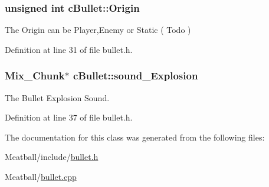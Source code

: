 \hypertarget{classc_bullet_a66bf644008f15b642e59514778d0dd42}{
\subsubsection[{Origin}]{\setlength{\rightskip}{0pt plus 5cm}unsigned int c\-Bullet\-::\-Origin}}\label{classc_bullet_a66bf644008f15b642e59514778d0dd42}


The Origin can be Player,Enemy or Static ( Todo ) 



Definition at line 31 of file bullet.\-h.

\hypertarget{classc_bullet_a05793bd5f273e252f3f491c532d45be1}{
\subsubsection[{sound\-\_\-\-Explosion}]{\setlength{\rightskip}{0pt plus 5cm}Mix\-\_\-\-Chunk$\ast$ c\-Bullet\-::sound\-\_\-\-Explosion}}\label{classc_bullet_a05793bd5f273e252f3f491c532d45be1}


The Bullet Explosion Sound. 



Definition at line 37 of file bullet.\-h.



The documentation for this class was generated from the following files\-:\begin{DoxyCompactItemize}
\item 
Meatball/include/\hyperlink{bullet_8h}{bullet.\-h}\item 
Meatball/\hyperlink{bullet_8cpp}{bullet.\-cpp}\end{DoxyCompactItemize}
